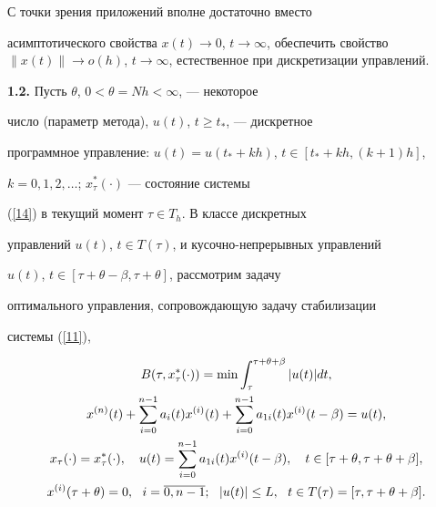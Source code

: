 С точки зрения приложений вполне достаточно вместо


асимптотического свойства $x(t) \rightarrow 0$, $t \rightarrow


\infty$, обеспечить свойство $\|x(t)\| \rightarrow o(h)$, $t


\rightarrow \infty$, естественное при дискретизации управлений.


\medskip





{\bf 1.2.} Пусть $\theta$, $0 < \theta=Nh < \infty$, --- некоторое


число (параметр метода), $u(t)$, $t \ge t_*$, --- дискретное


программное управление: $u(t)=u(t_*+kh)$, $t \in [t_*+kh, (k+1)h]$, \tts{[}


$k=0,1,2,\dotsc$; $x_{\tau}^{*}(\cdot)$ --- состояние системы


(\ref{14}) в текущий момент $\tau \in T_h$. В классе дискретных


управлений $u(t)$, $t \in T(\tau)$, и кусочно-непрерывных управлений


$u(t)$, $t \in [\tau+\theta-\beta, \tau+\theta]$, \tts{[} рассмотрим задачу


оптимального управления, сопровождающую задачу стабилизации


системы (\ref{11}),


\begin{gather}


B(\tau,x^*_{\tau}(\cdot)) =\min


\int_{\tau}^{\tau+\theta+\beta}|u(t)|dt, \notag \\


%


\label{16}


x^{(n)}(t)+\sum_{i=0}^{n-1}a_i(t)x^{(i)}(t)+


\sum_{i=0}^{n-1}a_{1i}(t)x^{(i)}(t-\beta)=u(t), \\


%


x_{\tau}(\cdot)=x_{\tau}^{*}(\cdot),\quad


u(t)=\sum_{i=0}^{n-1}a_{1i}(t)x^{(i)}(t-\beta),\quad t \in


[\tau+\theta, \tau+\theta+\beta],\notag\\


%


x^{(i)}(\tau+\theta)=0,\ \ i =\overline{0,n-1};\ \ |u(t)| \le L,


\ \ t \in T(\tau)=[\tau, \tau+\theta+\beta].\notag


\end{gather}





